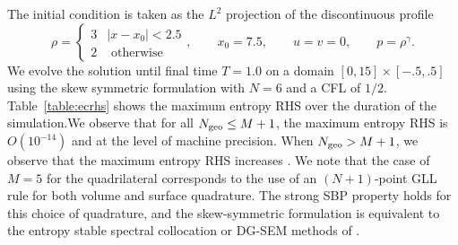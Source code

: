 \documentclass{svjour3}                     %
\begin{document}
The initial condition is taken as the $L^2$ projection of the discontinuous profile
\[
    \rho = \begin{cases}
    3 & |x-x_0| < 2.5\\
    2 & \text{ otherwise}
    \end{cases}, \qquad 
    x_0 = 7.5, \qquad u = v = 0, \qquad p = \rho^\gamma.
\]
We evolve the solution until final time $T = 1.0$ on a domain $[0,15]\times[-.5,.5]$ using the skew symmetric formulation with $N = 6$ and a CFL of $1/2$.  Table~\ref{table:ecrhs} shows the maximum entropy RHS over the duration of the simulation.We observe that for all $N_{\rm geo} \leq M+1$, the maximum entropy RHS is $O(10^{-14})$ and at the level of machine precision.  When $N_{\rm geo}> M+1$, we observe that the maximum entropy RHS increases .  We note that the case of $M= 5$ for the quadrilateral corresponds to the use of an $(N+1)$-point GLL rule for both volume and surface quadrature.  The strong SBP property holds for this choice of quadrature, and the skew-symmetric formulation is equivalent to the entropy stable spectral collocation or DG-SEM  methods of \cite{carpenter2014entropy, gassner2016split}.  

\begin{table}
\centering
{}\\
\caption{Maximum absolute value of the entropy RHS for degree $N=6$ over $t\in [0,1]$ on triangular and quadrilateral meshes.  The volume quadrature for the quadrilateral mesh is taken to be $(N+1)$-point GLL quadrature.  The surface quadrature is taken to be a 1D GLL quadrature with a varying number of points, such that the rule is exact for degree $M+N$ polynomials.  }
\label{table:ecrhs}
\end{table}
\end{document}
